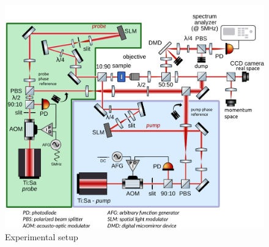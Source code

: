 \begin{figure}
    \centering
    \includegraphics[width=1\textwidth]{chap3_custom_st/fig/set_up_spacetime.pdf}
    \caption{Experimental setup}
    \label{fig:setup}
\end{figure}



